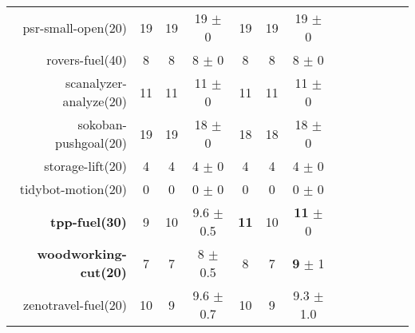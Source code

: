 \begin{center}
\begin{tabular}{|r|*{4}{ccc|}}
psr-small-open(20) & 19 & 19 & 19 \(\pm\) 0 & 19 & 19 & 19 \(\pm\) 0\\
rovers-fuel(40) & 8 & 8 & 8 \(\pm\) 0 & 8 & 8 & 8 \(\pm\) 0\\
scanalyzer-analyze(20) & 11 & 11 & 11 \(\pm\) 0 & 11 & 11 & 11 \(\pm\) 0\\
sokoban-pushgoal(20) & 19 & 19 & 18 \(\pm\) 0 & 18 & 18 & 18 \(\pm\) 0\\
storage-lift(20) & 4 & 4 & 4 \(\pm\) 0 & 4 & 4 & 4 \(\pm\) 0\\
tidybot-motion(20) & 0 & 0 & 0 \(\pm\) 0 & 0 & 0 & 0 \(\pm\) 0\\
\textbf{tpp-fuel(30)} & 9 & 10 & 9.6 \(\pm\) 0.5 & \textbf{11} & 10 & \textbf{11} \(\pm\) 0\\
\textbf{woodworking-cut(20)} & 7 & 7 & 8 \(\pm\) 0.5 & 8 & 7 & \textbf{9} \(\pm\) 1\\
zenotravel-fuel(20) & 10 & 9 & 9.6 \(\pm\) 0.7 & 10 & 9 & 9.3 \(\pm\) 1.0\\
\end{tabular}
\end{center}
